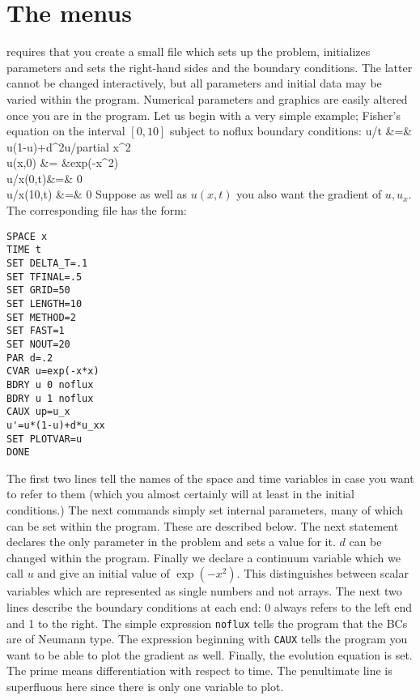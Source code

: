 \section{The menus} \xtc requires that you create a
small file which sets up the problem, initializes parameters and sets
the right-hand sides and the boundary conditions.  The latter cannot
be changed interactively, but all parameters and initial data may be
varied within the program. Numerical parameters and graphics are
easily altered once you are in the program.  Let us begin with a very
simple example; Fisher's equation on the interval $[0,10]$ subject to
noflux boundary conditions:
\beqa
\partial u/\partial t &=& u(1-u)+d\partial^2u/partial x^2 \\
u(x,0) &= &exp(-x^2) \\
\partial u/\partial x(0,t)&=& 0 \\
\partial u/\partial x(10,t) &=& 0 
\eeqa
Suppose as well as $u(x,t)$ you also want the gradient of $u, u_x.$
The corresponding \xtc file has the form:
\begin{verbatim}
SPACE x
TIME t
SET DELTA_T=.1
SET TFINAL=.5
SET GRID=50
SET LENGTH=10
SET METHOD=2
SET FAST=1
SET NOUT=20
PAR d=.2
CVAR u=exp(-x*x)
BDRY u 0 noflux
BDRY u 1 noflux
CAUX up=u_x
u'=u*(1-u)+d*u_xx
SET PLOTVAR=u
DONE
\end{verbatim}
The first two lines tell \xtc the names of the space and time
variables in case you want to refer to them (which you almost
certainly will at least in the initial conditions.)  The next commands
simply set internal parameters, many of which can be set within the
program.  These are described below.  The next statement declares the
only parameter in the problem and sets a value for it.  $d$ can be
changed within the program.  Finally we declare a continuum variable
which we call $u$ and give an initial value of $\exp(-x^2).$  This
distinguishes between scalar variables which are represented as single
numbers and not arrays.  The next two lines describe the boundary
conditions at each end: 0 always refers to the left end and 1 to the
right.  The simple expression {\tt noflux} tells the program that the
BCs are of Neumann type. The expression beginning with {\tt CAUX} tells the program you want to be able to plot the gradient as well.
 Finally, the evolution equation is set. The
prime means differentiation with respect to time. The penultimate
line is superfluous here since there is only one variable to plot. 

